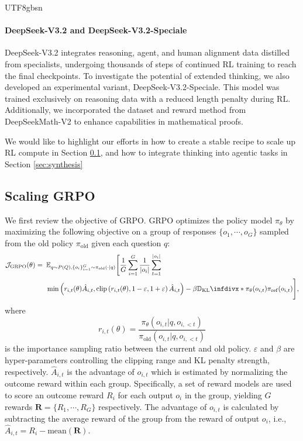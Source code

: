 \documentclass[11pt, a4paper, logo, copyright, nonumbering]{deepseek}
\def\newmodel{DeepSeek-V3.2}
\def\highmodel{DeepSeek-V3.2-Speciale}
\newcommand{\Dkl}{\mathbb{D}_{\mathrm{KL}}\infdivx*}
\newcommand{\Jgrpo}{\mathcal{J}_{\mathrm{GRPO}}}
\newcommand{\piold}{\pi_{\mathrm{old}}}
\newcommand{\piref}{\pi_{\mathrm{ref}}}
\begin{document}
\begin{CJK*}{UTF8}{gbsn}
\paragraph{\newmodel{} and \highmodel{}}
\newmodel{} integrates reasoning, agent, and human alignment data distilled from specialists, undergoing thousands of steps of continued RL training to reach the final checkpoints.
To investigate the potential of extended thinking, we also developed an experimental variant, \highmodel{}. This model was trained exclusively on reasoning data with a reduced length penalty during RL. Additionally, we incorporated the dataset and reward method from DeepSeekMath-V2 \citep{deepseek-math-v2} to enhance capabilities in mathematical proofs.

We would like to highlight our efforts in how to create a stable recipe to scale up RL compute in Section \ref{sec:grpo}, and how to integrate thinking into agentic tasks in Section \ref{sec:synthesis}

\subsection{Scaling GRPO}
\label{sec:grpo}

We first review the objective of GRPO. GRPO optimizes the policy model $\pi_{\theta}$ by maximizing the following objective on a group of responses $\{o_1,\cdots, o_G\}$ sampled from the old policy $\piold$ given each question $q$:
\begin{align}
    \Jgrpo(\theta)=\enspace& \mathbb{E}_{
        q\sim P(Q), 
        \{o_i\}_{i=1}^G\sim \piold(\cdot|q)}\Bigg[
            \frac{1}{G}\sum_{i=1}^G\frac{1}{|o_i|}\sum_{t=1}^{|o_i|} \nonumber\\
            &\min\left(
                r_{i,t}(\theta) \hat{A}_{i,t}, 
                \text{clip}\left(r_{i,t}(\theta), 1-\varepsilon, 1+\varepsilon\right)\hat{A}_{i,t}
            \right) - \beta \Dkl{\pi_\theta(o_{i,t})}{\piref(o_{i,t})}
        \Bigg],
\end{align}
where
\begin{equation}
    r_{i,t}(\theta)=\frac{\pi_\theta(o_{i,t}|q,o_{i,<t})}{\piold(o_{i,t}|q,o_{i,<t})}
\end{equation}
is the importance sampling ratio between the current and old policy. $\varepsilon$ and $\beta$ are hyper-parameters controlling the clipping range and KL penalty strength, respectively. $\hat{A}_{i,t}$ is the advantage of $o_{i,t}$ which is estimated by normalizing the outcome reward within each group. Specifically, a set of reward models are used to score an outcome reward $R_i$ for each output $o_i$ in the group, yielding $G$ rewards $\boldsymbol{R}=\{R_1,\cdots,R_G\}$ respectively. The advantage of $o_{i,t}$ is calculated by subtracting the average reward of the group from the reward of output $o_i$, i.e., $\hat{A}_{i,t} = R_i-\text{mean}(\boldsymbol{R})$. 


\end{CJK*}
\end{document}
